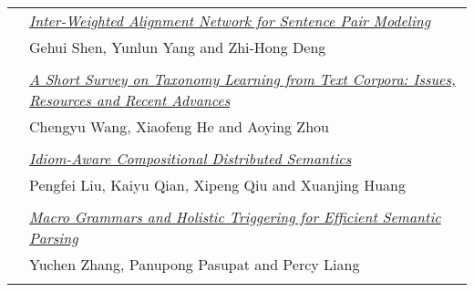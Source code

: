 \begin{tabular}{p{20mm}p{128mm}}
 & \hyperlink{page.1188}{\em Inter-Weighted Alignment Network for Sentence Pair Modeling}\\
         & Gehui Shen, Yunlun Yang and Zhi-Hong Deng \\
\\

 & \hyperlink{page.1199}{\em A Short Survey on Taxonomy Learning from Text Corpora: Issues, Resources and Recent Advances}\\
         & Chengyu Wang, Xiaofeng He and Aoying Zhou \\
\\

 & \hyperlink{page.1213}{\em Idiom-Aware Compositional Distributed Semantics}\\
         & Pengfei Liu, Kaiyu Qian, Xipeng Qiu and Xuanjing Huang \\
\\

 & \hyperlink{page.1223}{\em Macro Grammars and Holistic Triggering for Efficient Semantic Parsing}\\
         & Yuchen Zhang, Panupong Pasupat and Percy Liang \\
\\

\end{tabular}
\newpage
